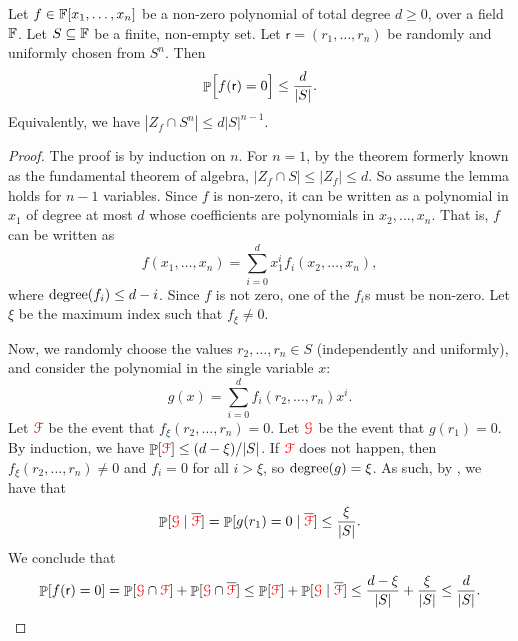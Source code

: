 \begin{lemma}
    Let
    \begin{math}
        f \in \mathbb{F}[x_1, \ldots, x_n]
    \end{math}
    be a non-zero polynomial of total degree $d \geq 0$, over a field
    $\mathbb{F}$.  Let $S \subseteq \mathbb{F}$ be a finite, non-empty set. Let
    $\mathsf{r} = (r_1, \ldots, r_n)$ be randomly and uniformly chosen
    from $S^n$. Then
    \begin{equation*}
        \Prob{ \Bigl.f( \mathsf{r} ) = 0 } \leq \frac{d}{|S|}.
    \end{equation*}
    Equivalently, we have $|Z_f \cap S^n| \leq d |S|^{n-1}$.
\end{lemma}
\begin{proof}
    The proof is by induction on $n$. For $n = 1$, by the theorem
    formerly known as the fundamental theorem of algebra,
    $|Z_f \cap S| \leq |Z_f| \leq d$. So assume the lemma holds for
    $n-1$ variables. Since $f$ is non-zero, it can be written as a
    polynomial in $x_1$ of degree at most $d$ whose coefficients are
    polynomials in $x_2, \ldots, x_n$. That is, $f$ can be written as
    \begin{equation*}
        f(x_1, \ldots, x_n)
        =%
        \sum_{i=0}^d x_1^i f_i(x_2, \ldots, x_n),
    \end{equation*}
    where $\degreeX{f_i} \leq d-i$.  Since $f$ is not zero, one of the
    $f_i$s must be non-zero. Let $\xi$ be the maximum index such that
    $f_\xi \neq 0$.

    Now, we randomly choose the values $r_2, \ldots, r_n \in S$
    (independently and uniformly), and consider the polynomial in the
    single variable $x$:
    \begin{equation*}
        g(x) = \sum_{i=0}^d f_i(r_2, \ldots,r_n) x^i.%
    \end{equation*}
    Let ${\textcolor{red}{\EuScript{F}}}$ be the event that $f_\xi(r_2, \ldots, r_n) = 0$.  Let
    ${\textcolor{red}{\EuScript{G}}}$ be the event that $g(r_1) = 0$.  By induction, we have
    $\Prob{\EventF} \leq (d-\xi)/|S|$. If ${\textcolor{red}{\EuScript{F}}}$ does
    not happen, then $f_\xi(r_2, \ldots, r_n) \neq 0$ and $f_i = 0$ for all $i > \xi$, so $\degreeX{g} = \xi$.
    As such, by , we have that
    \begin{equation*}
        \ProbCond{ \EventG}{\smash{\overline{\EventF}}} = \ProbCond{ g(r_1)
           = 0}{\smash{\overline{\EventF}}}%
        \leq%
        \frac{\xi}{|S|}.
    \end{equation*}
    We conclude that
    \begin{equation*}
        \Prob{f(\mathsf{r}) = 0}
        =%
        \Prob{\EventG \cap \EventF}
        + 
        \Prob{\EventG \cap \smash{ \overline{\EventF}}}
        \leq%
        \Prob{\EventF} +
        \ProbCond{\EventG}{\smash{\overline{\EventF}} }
        \leq
        \frac{d-\xi}{|S|} + \frac{\xi}{|S|}%
        \leq%
        \frac{d}{|S|}.
  \end{equation*}
\end{proof}

